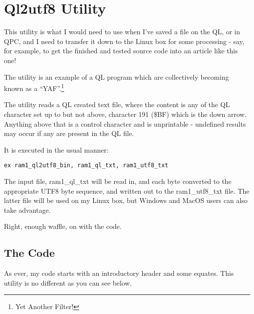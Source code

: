 \chapter{Ql2utf8 Utility}

This utility is what I would need to use when I've saved a file on
the QL, or in QPC, and I need to transfer it down to the Linux box
for some processing - say, for example, to get the finished and tested
source code into an article like this one!

The utility is an example of a QL program which are collectively becoming
known as a ``YAF''.\footnote{Yet Another Filter!}

The utility reads a QL created text file, where the content is any
of the QL character set up to but not above, character 191 (\$BF)
which is the down arrow. Anything above that is a control character
and is unprintable - undefined results may occur if any are present
in the QL file.

It is executed in the usual manner:

\begin{lstlisting}[tabsize=4]
ex ram1_ql2utf8_bin, ram1_ql_txt, ram1_utf8_txt
\end{lstlisting}

The input file, ram1\_ql\_txt will be read in, and each byte converted
to the appropriate UTF8 byte sequence, and written out to the ram1\_utf8\_txt
file. The latter file will be used on my Linux box, but Windows and
MacOS users can also take advantage.

Right, enough waffle, on with the code.

\section{The Code}

As ever, my code starts with an introductory header and some equates.
This utility is no different as you can see below.

